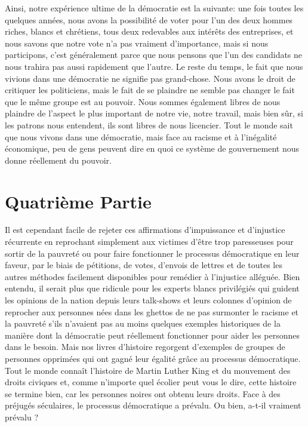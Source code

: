 Ainsi, notre expérience ultime de la démocratie est la suivante: une fois toutes les quelques années, nous avons la possibilité de voter pour l'un des deux hommes riches, blancs et chrétiens, tous deux redevables aux intérêts des entreprises, et nous savons que notre vote n'a pas vraiment d'importance, mais si nous participons, c'est généralement parce que nous pensons que l'un des candidats ne nous trahira pas aussi rapidement que l'autre. Le reste du temps, le fait que nous vivions dans une démocratie ne signifie pas grand-chose. Nous avons le droit de critiquer les politiciens, mais le fait de se plaindre ne semble pas changer le fait que le même groupe est au pouvoir. Nous sommes également libres de nous plaindre de l'aspect le plus important de notre vie, notre travail, mais bien sûr, si les patrons nous entendent, ils sont libres de nous licencier. Tout le monde sait que nous vivons dans une démocratie, mais face au racisme et à l'inégalité économique, peu de gens peuvent dire en quoi ce système de gouvernement nous donne réellement du pouvoir.

\chapter*{\textbf{Quatrième Partie}}

Il est cependant facile de rejeter ces affirmations d'impuissance et d'injustice récurrente en reprochant simplement aux victimes d'être trop paresseuses pour sortir de la pauvreté ou pour faire fonctionner le processus démocratique en leur faveur, par le biais de pétitions, de votes, d'envois de lettres et de toutes les autres méthodes facilement disponibles pour remédier à l'injustice alléguée. Bien entendu, il serait plus que ridicule pour les experts blancs privilégiés qui guident les opinions de la nation depuis leurs talk-shows et leurs colonnes d'opinion de reprocher aux personnes nées dans les ghettos de ne pas surmonter le racisme et la pauvreté s'ils n'avaient pas au moins quelques exemples historiques de la manière dont la démocratie peut réellement fonctionner pour aider les personnes dans le besoin. Mais nos livres d'histoire regorgent d'exemples de groupes de personnes opprimées qui ont gagné leur égalité grâce au processus démocratique. Tout le monde connaît l'histoire de Martin Luther King et du mouvement des droits civiques et, comme n'importe quel écolier peut vous le dire, cette histoire se termine bien, car les personnes noires ont obtenu leurs droits. Face à des préjugés séculaires, le processus démocratique a prévalu. Ou bien, a-t-il vraiment prévalu ?

